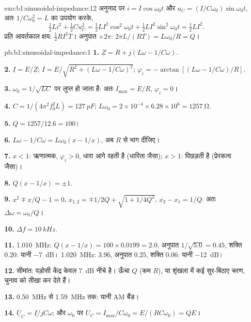 \begin{solution}{exo:b1:sinusoidal-impedance:12}
अनुनाद पर $i = I\cos\omega_0 t$ और $u_C = (I/C\omega_0)\sin\omega_0 t$,
अतः $1/C\omega_0^2 = L$ का उपयोग करके,
\[
\tfrac12 Li^2 + \tfrac12 Cu_C^2 = \tfrac12 LI^2\cos^2\omega_0 t
+ \tfrac12 LI^2\sin^2\omega_0 t = \tfrac12 LI^2 .
\]
प्रति आवर्तकाल क्षय: $\tfrac12 RI^2T$। अनुपात $\times 2\pi$: $2\pi L/(RT)
= L\omega_0/R = Q$।
\end{solution}

\begin{solution}{pb:b1:sinusoidal-impedance:1}
\textbf{1.} $\underline Z = R + j(L\omega - 1/C\omega)$.

\textbf{2.} $\underline I = E/\underline Z$; $I = E/\sqrt{R^2 + (L\omega -
1/C\omega)^2}$; $\varphi_i = -\arctan[(L\omega - 1/C\omega)/R]$.

\textbf{3.}  $\omega_0 = 1/\sqrt{LC}$ पर लुप्त हो जाता है: अतः $I_{\max}
= E/R$, $\varphi_i = 0$।

\textbf{4.} $C = 1/(4\pi^2f_0^2L) = \qty{127}{pF}$; $L\omega_0 = 2\times10^{-4}
\times 6.28\times10^6 = \qty{1257}{\ohm}$.

\textbf{5.} $Q = 1257/12.6 = 100$।

\textbf{6.} $L\omega - 1/C\omega = L\omega_0(x - 1/x)$, अब $R$ से भाग दीजिए।

\textbf{7.} $x < 1$:  ऋणात्मक, $\varphi_i > 0$, धारा
आगे रहती है (धारिता जैसा); $x > 1$: पिछड़ती है (प्रेरकत्व जैसा)।

\textbf{8.} $Q(x - 1/x) = \pm1$.

\textbf{9.} $x^2 \mp x/Q - 1 = 0$, $x_{1,2} = \mp1/2Q + \sqrt{1 + 1/4Q^2}$,
$x_2 - x_1 = 1/Q$: अतः $\Delta\omega = \omega_0/Q$।

\textbf{10.} $\Delta f = \qty{10}{kHz}$.

\textbf{11.} \qty{1.010}{MHz}: $Q(x - 1/x) = 100 \times 0.0199 = 2.0$,
अनुपात $1/\sqrt{5.0} = 0.45$, शक्ति $0.20$: यानी \qty{-7}{dB}। \qty{1.020}{MHz}:
$3.96$, अनुपात $0.25$, शक्ति $0.06$: यानी \qty{-12}{dB}।

\textbf{12.} सीमांत: पड़ोसी केंद्र केवल \qty{7}{dB} नीचे है। ऊँचा
$Q$ (कम $R$), या शृंखला में कई सुर-बिठाए चरण, चुनाव को तीखा कर देते हैं।

\textbf{13.} \qty{0.50}{MHz} से \qty{1.59}{MHz} तक: यानी AM बैंड।

\textbf{14.} $\underline U_C = \underline I/jC\omega$; और $\omega_0$ पर
$U_C = I_{\max}/C\omega_0 = E/(RC\omega_0) = QE$।


\end{solution}
